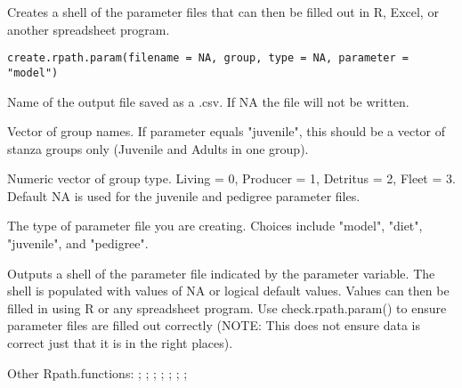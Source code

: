 \documentclass[a4paper]{book}
\begin{document}
%
\begin{Description}\relax
Creates a shell of the parameter files that can then be filled out in R, Excel, or
another spreadsheet program.
\end{Description}
%
\begin{Usage}
\begin{verbatim}
create.rpath.param(filename = NA, group, type = NA, parameter = "model")
\end{verbatim}
\end{Usage}
%
\begin{Arguments}
\begin{ldescription}
\item[\code{filename}] Name of the output file saved as a .csv. If NA the file will not be written.

\item[\code{group}] Vector of group names.  If parameter equals "juvenile", this should be a vector of
stanza groups only (Juvenile and Adults in one group).

\item[\code{type}] Numeric vector of group type. Living = 0, Producer = 1, Detritus = 2,
Fleet = 3. Default NA is used for the juvenile and pedigree parameter files.

\item[\code{parameter}] The type of parameter file you are creating.  Choices include "model",
"diet", "juvenile", and "pedigree".
\end{ldescription}
\end{Arguments}
%
\begin{Value}
Outputs a shell of the parameter file indicated by the parameter variable.  The shell
is populated with values of NA or logical default values.  Values can then be filled in using
R or any spreadsheet program.  Use check.rpath.param() to ensure parameter files are filled out
correctly (NOTE: This does not ensure data is correct just that it is in the right places).
\end{Value}
%
\begin{SeeAlso}\relax
Other Rpath.functions: ;
; ;
; ;
; ;
\end{SeeAlso}
\end{document}
